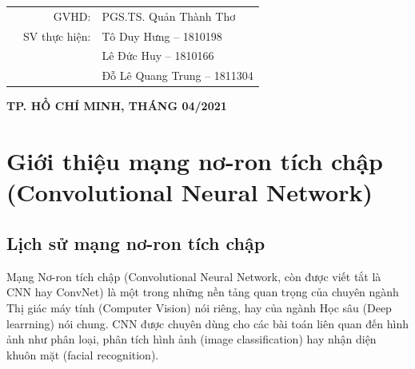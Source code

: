 \documentclass[a4paper]{article}
\begin{document}
\begin{titlepage}
\vspace{3cm}

\begin{table}[h]
			\begin{tabular}{rrl}
				\hspace{4 cm} & GVHD: & PGS.TS. Quản Thành Thơ\\[0.5cm]
				& SV thực hiện: & Tô Duy Hưng  -- 1810198\\
				& & Lê Đức Huy -- 1810166\\
				& & Đỗ Lê Quang Trung -- 1811304\\
			
			\end{tabular}
		\end{table}

\vspace{2.4cm}
		\begin{center}
			\bf{ {\large TP. HỒ CHÍ MINH, THÁNG 04/2021}}\\
		\end{center}
\end{titlepage}


\newpage
\tableofcontents
\newpage




\section{Giới thiệu mạng nơ-ron tích chập (Convolutional Neural Network)}

\subsection{Lịch sử  mạng nơ-ron tích chập}

Mạng Nơ-ron tích chập (Convolutional Neural Network, còn được viết tắt là
CNN hay ConvNet) là một trong những nền tảng quan trọng của chuyên ngành Thị
giác máy tính (Computer Vision) nói riêng, hay của ngành Học sâu (Deep learrning)
nói chung. CNN được chuyên dùng cho các bài toán liên quan đến hình ảnh như
phân loại, phân tích hình ảnh (image classification) hay nhận diện khuôn mặt (facial
recognition).
\end{document}
